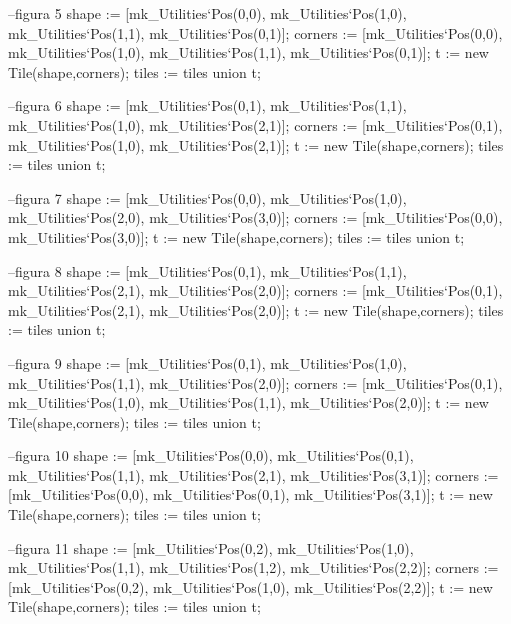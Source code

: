 \begin{vdm_al}
          --figura 5
          shape := [mk_Utilities`Pos(0,0), mk_Utilities`Pos(1,0), mk_Utilities`Pos(1,1),
       mk_Utilities`Pos(0,1)];
          corners := [mk_Utilities`Pos(0,0), mk_Utilities`Pos(1,0), mk_Utilities`Pos(1,1),
       mk_Utilities`Pos(0,1)];
          t := new Tile(shape,corners); 
          tiles := tiles union {t};
          
          --figura 6
          shape := [mk_Utilities`Pos(0,1), mk_Utilities`Pos(1,1), mk_Utilities`Pos(1,0),
       mk_Utilities`Pos(2,1)];
          corners :=  [mk_Utilities`Pos(0,1), mk_Utilities`Pos(1,0), mk_Utilities`Pos(2,1)];
          t := new Tile(shape,corners); 
          tiles := tiles union {t};
          
          --figura 7
          shape := [mk_Utilities`Pos(0,0), mk_Utilities`Pos(1,0), mk_Utilities`Pos(2,0),
       mk_Utilities`Pos(3,0)];
          corners :=  [mk_Utilities`Pos(0,0), mk_Utilities`Pos(3,0)];
          t := new Tile(shape,corners); 
          tiles := tiles union {t};
          
          --figura 8
          shape := [mk_Utilities`Pos(0,1), mk_Utilities`Pos(1,1), mk_Utilities`Pos(2,1),
       mk_Utilities`Pos(2,0)];
          corners :=  [mk_Utilities`Pos(0,1), mk_Utilities`Pos(2,1), mk_Utilities`Pos(2,0)];
          t := new Tile(shape,corners); 
          tiles := tiles union {t};
          
          --figura 9
          shape := [mk_Utilities`Pos(0,1), mk_Utilities`Pos(1,0), mk_Utilities`Pos(1,1),
       mk_Utilities`Pos(2,0)];
          corners := [mk_Utilities`Pos(0,1), mk_Utilities`Pos(1,0), mk_Utilities`Pos(1,1),
       mk_Utilities`Pos(2,0)];
          t := new Tile(shape,corners); 
          tiles := tiles union {t};
          
          --figura 10
          shape := [mk_Utilities`Pos(0,0), mk_Utilities`Pos(0,1), mk_Utilities`Pos(1,1),
       mk_Utilities`Pos(2,1), mk_Utilities`Pos(3,1)];
          corners := [mk_Utilities`Pos(0,0), mk_Utilities`Pos(0,1), mk_Utilities`Pos(3,1)];
          t := new Tile(shape,corners); 
          tiles := tiles union {t};
          
          --figura 11
          shape := [mk_Utilities`Pos(0,2), mk_Utilities`Pos(1,0), mk_Utilities`Pos(1,1),
       mk_Utilities`Pos(1,2), mk_Utilities`Pos(2,2)];
          corners := [mk_Utilities`Pos(0,2), mk_Utilities`Pos(1,0), mk_Utilities`Pos(2,2)];
          t := new Tile(shape,corners); 
          tiles := tiles union {t};
          

\end{vdm_al}
